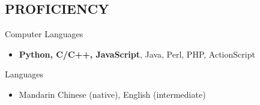 \documentclass[margin]{resume}
\begin{document}
\begin{resume}
\section{PROFICIENCY}
Computer Languages
\begin{itemize} \itemsep -2pt
    \item[] {\bf Python, C/C++, JavaScript}, Java, Perl, PHP, ActionScript
\end{itemize}

Languages
\begin{itemize} \itemsep -2pt
    \item[] Mandarin Chinese (native), English (intermediate)
\end{itemize}


\end{resume}
\end{document}
